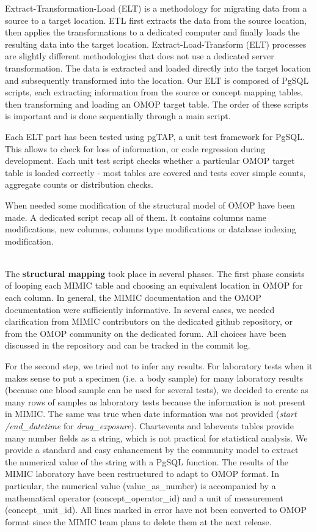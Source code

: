 Extract-Transformation-Load (ELT) is a methodology for migrating data from a 
source to a target location. ETL first extracts the data from the source location, 
then applies the transformations to a dedicated computer and finally loads the 
resulting data into the target location. Extract-Load-Transform (ELT) processes 
are slightly different methodologies that does not use a dedicated server 
transformation. The data is extracted and loaded directly into the target location 
and subsequently transformed into the location.
Our ELT is composed of PgSQL scripts, each extracting information from the source 
or concept mapping tables, then transforming and loading an OMOP target table. 
The order of these scripts is important and is done sequentially through a main 
script.

Each ELT part has been tested using pgTAP, a unit test framework for PgSQL.
This allows to check for loss of information, or code regression during
development. Each unit test script checks whether a particular OMOP target
table is loaded correctly - most tables are covered and tests cover simple
counts, aggregate counts or distribution checks.

When needed some modification of the structural model of OMOP have been made. A
dedicated script recap all of them. It contains columns name modifications, new
columns, columns type modifications or database indexing modification.

\\

The \textbf{structural mapping} took place in several phases.
The first phase consists of looping each MIMIC table and choosing an equivalent 
location in OMOP for each column. In general, the MIMIC documentation and the OMOP 
documentation were sufficiently informative. In several cases, we needed 
clarification from MIMIC contributors on the dedicated github repository, or from 
the OMOP community on the dedicated forum. All choices have been discussed in the 
repository \cite{mimic-omop-github} and can be tracked in the commit log.

For the second step, we tried not to infer any results. For laboratory tests when 
it makes sense to put a specimen (i.e. a body sample) for many laboratory results 
(because one blood sample can be used for several tests), we decided to create as 
many rows of samples as laboratory tests because the information is not present 
in MIMIC. The same was true when date information was not provided (\textit{start
/end\_datetime} for \textit{drug\_exposure}).
Chartevents and labevents tables provide many number fields as a string, which is 
not practical for statistical analysis. We provide a standard and easy enhancement 
by the community model to extract the numerical value of the string with a PgSQL 
function. The results of the MIMIC laboratory have been restructured to adapt to 
OMOP format. In particular, the numerical value (value\_as\_number) is accompanied 
by a mathematical operator (concept\_operator\_id) and a unit of measurement 
(concept\_unit\_id). All lines marked in error have not been converted to OMOP 
format since the MIMIC team plans to delete them at the next release.

